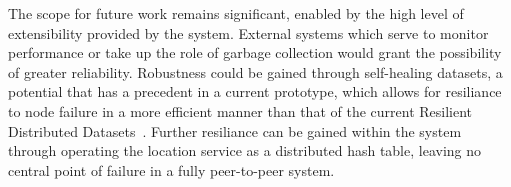 \documentclass[letterpaper, inpress]{jds} %
\begin{document}
The scope for future work remains significant, enabled by the high level of extensibility provided by the system.
External systems which serve to monitor performance or take up the role of garbage collection would grant the possibility of greater reliability.
Robustness could be gained through self-healing datasets, a potential that has a precedent in a current prototype, which allows for resiliance to node failure in a more efficient manner than that of the current Resilient Distributed Datasets~\citep{zaharia2012resilient}.
Further resiliance can be gained within the system through operating the location service as a distributed hash table, leaving no central point of failure in a fully peer-to-peer system.



\end{document}
